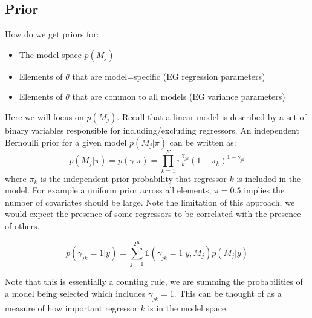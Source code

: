 \documentclass[DIV=14,titlepage=false]{scrreprt}
\begin{document}
\subsection{Prior}
How do we get priors for:
\begin{itemize}
    \item The model space $p(M_j)$
    \item Elements of $\theta$ that are model=specific (EG regression parameters)
    \item Elements of $\theta$ that are common to all models (EG variance parameters)
\end{itemize}
Here we will focus on $p(M_j)$. Recall that a linear model is described by a set of binary variables responsible for including/excluding regressors. An independent Bernoulli prior for a given model $p(M_j|\pi)$ can be written as:
\[
    p(M_j|\pi) = p(\gamma|\pi) = \prod_{k=1}^K \pi_k^{\gamma_{jk}}(1-\pi_k)^{1-\gamma_{jk}}
\]
where $\pi_k$ is the independent prior probability that regressor $k$ is included in the model. For example a uniform prior across all elements, $\pi = 0.5$ implies the number of covariates should be large. Note the limitation of this approach, we would expect the presence of some regressors to be correlated with the presence of others. 
\begin{definition}
    \[
        p(\gamma_{jk} = 1|y) = \sum_{j=1}^{2^K} \mathbb{1}(\gamma_{jk} = 1|y, M_j)p(M_j|y)
    \]
\end{definition}
Note that this is essentially a counting rule, we are summing the probabilities of a model being selected which includes $\gamma_{jk} = 1$. This can be thought of as a measure of how important regressor $k$ is in the model space.
\end{document}
